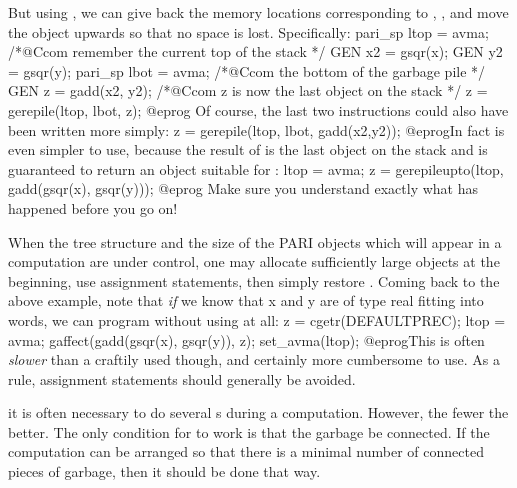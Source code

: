 But using , we can give back the memory locations corresponding
to , , and move the object  upwards so that no
space is lost. Specifically:
\bprog
  pari_sp ltop = avma;  /*@Ccom remember the current top of the stack */
  GEN x2 = gsqr(x);
  GEN y2 = gsqr(y);
  pari_sp lbot = avma;  /*@Ccom the bottom of the garbage pile */
  GEN z = gadd(x2, y2); /*@Ccom z is now the last object on the stack */
  z = gerepile(ltop, lbot, z);
@eprog
\noindent Of course, the last two instructions could also have been
written more simply:
\bprog
  z = gerepile(ltop, lbot, gadd(x2,y2));
@eprog\noindent In fact  is even simpler to use, because
the result of  is the last object on the stack and 
is guaranteed to return an object suitable for :
\bprog
  ltop = avma;
  z = gerepileupto(ltop, gadd(gsqr(x), gsqr(y)));
@eprog\noindent
Make sure you understand exactly what has happened before you go on!

 When the tree structure and
the size of the PARI objects which will appear in a computation are under
control, one may allocate sufficiently large objects at the beginning,
use assignment statements, then simply restore . Coming back to the
above example, note that \emph{if} we know that x and y are of type real
fitting into  words, we can program without using
 at all:
\bprog
  z = cgetr(DEFAULTPREC); ltop = avma;
  gaffect(gadd(gsqr(x), gsqr(y)), z);
  set_avma(ltop);
@eprog\noindent This is often \emph{slower} than a craftily used
 though, and certainly more cumbersome to use. As a rule,
assignment statements should generally be avoided.

 it is often necessary to do several
s during a computation. However, the fewer the better. The only
condition for  to work is that the garbage be connected. If the
computation can be arranged so that there is a minimal number of connected
pieces of garbage, then it should be done that way.

